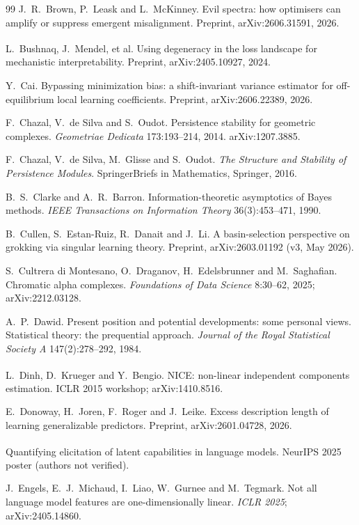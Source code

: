 \documentclass[11pt,a4paper]{article}
\newcommand{\unv}{\textsuperscript{\dag}}
\begin{document}
\begin{thebibliography}{99}
 J.~R.~Brown, P.~Leask and L.~McKinney. Evil spectra:
how optimisers can amplify or suppress emergent misalignment. Preprint,
arXiv:2606.31591, 2026.

\unv{} L.~Bushnaq, J.~Mendel, et al. Using degeneracy
in the loss landscape for mechanistic interpretability. Preprint,
arXiv:2405.10927, 2024.

 Y.~Cai. Bypassing minimization bias: a shift-invariant
variance estimator for off-equilibrium local learning coefficients.
Preprint, arXiv:2606.22389, 2026.

 F.~Chazal, V.~de Silva and S.~Oudot. Persistence
stability for geometric complexes. \emph{Geometriae Dedicata}
173:193--214, 2014. arXiv:1207.3885.

 F.~Chazal, V.~de Silva, M.~Glisse and S.~Oudot.
\emph{The Structure and Stability of Persistence Modules}. SpringerBriefs in
Mathematics, Springer, 2016.

 B.~S.~Clarke and A.~R.~Barron.
Information-theoretic asymptotics of Bayes methods. \emph{IEEE
Transactions on Information Theory} 36(3):453--471, 1990.

 B.~Cullen, S.~Estan-Ruiz, R.~Danait and J.~Li. A
basin-selection perspective on grokking via singular learning theory.
Preprint, arXiv:2603.01192 (v3, May 2026).

 S.~Cultrera di Montesano, O.~Draganov,
H.~Edelsbrunner and M.~Saghafian. Chromatic alpha complexes.
\emph{Foundations of Data Science} 8:30--62, 2025; arXiv:2212.03128.

 A.~P.~Dawid. Present position and potential
developments: some personal views. Statistical theory: the prequential
approach. \emph{Journal of the Royal Statistical Society A}
147(2):278--292, 1984.

\unv{} L.~Dinh, D.~Krueger and Y.~Bengio. NICE: non-linear
independent components estimation. ICLR 2015 workshop; arXiv:1410.8516.

 E.~Donoway, H.~Joren, F.~Roger and J.~Leike. Excess
description length of learning generalizable predictors. Preprint,
arXiv:2601.04728, 2026.

\unv{} Quantifying elicitation of latent
capabilities in language models. NeurIPS 2025 poster (authors not
verified).

 J.~Engels, E.~J.~Michaud, I.~Liao, W.~Gurnee and
M.~Tegmark. Not all language model features are one-dimensionally linear.
\emph{ICLR 2025}; arXiv:2405.14860.


\end{thebibliography}
\end{document}
